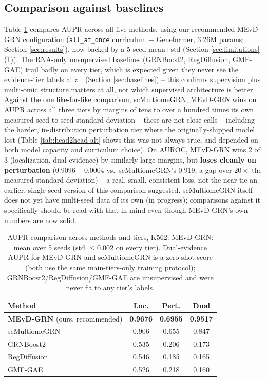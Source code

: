 \documentclass{article}
\theoremstyle{plain}
\theoremstyle{definition}
\begin{document}
\subsection{Comparison against baselines}
\label{sec:head2head}
Table \ref{tab:baselines} compares AUPR across all five methods, using our
recommended MEvD-GRN configuration (\texttt{all\_at\_once} curriculum +
Geneformer, 3.26M params; Section \ref{sec:results}), now backed by a
5-seed mean$\pm$std (Section \ref{sec:limitations} (1)). The RNA-only
unsupervised baselines (GRNBoost2, RegDiffusion, GMF-GAE) trail badly on
every tier, which is expected given they never see the evidence-tier labels
at all (Section \ref{sec:baselines}) -- this confirms supervision plus
multi-omic structure matters at all, not which supervised architecture is
better. Against the one like-for-like comparison, scMultiomeGRN, MEvD-GRN
wins on AUPR across all three tiers by margins of tens to over a hundred
times its own measured seed-to-seed standard deviation -- these are not
close calls -- including the harder, in-distribution perturbation tier
where the originally-shipped model lost (Table \ref{tab:head2head-alt}
shows this was not always true, and depended on both model capacity and
curriculum choice). On AUROC, MEvD-GRN wins 2 of 3 (localization,
dual-evidence) by similarly large margins, but \textbf{loses cleanly on
perturbation} ($0.9096\pm0.0004$ vs.\ scMultiomeGRN's $0.919$, a gap over
$20\times$ the measured standard deviation) -- a real, small, consistent
loss, not the near-tie an earlier, single-seed version of this comparison
suggested. scMultiomeGRN itself does not yet have multi-seed data of its
own (in progress); comparisons against it specifically should be read with
that in mind even though MEvD-GRN's own numbers are now solid.

\begin{table}[t]
\caption{AUPR comparison across methods and tiers, K562. MEvD-GRN: mean over 5 seeds (std $\leq0.002$ on every
tier). Dual-evidence AUPR for MEvD-GRN and scMultiomeGRN is a zero-shot score (both use the same main-tiers-only
training protocol); GRNBoost2/RegDiffusion/GMF-GAE are unsupervised and were never fit to any tier's labels.}
\label{tab:baselines}
\vskip 0.1in
\begin{center}
\begin{small}
\begin{tabular}{lccc}
\toprule
Method & Loc. & Pert. & Dual \\
\midrule
\textbf{MEvD-GRN} (ours, recommended) & \textbf{0.9676} & \textbf{0.6955} & \textbf{0.9517} \\
scMultiomeGRN & 0.906 & 0.655 & 0.847 \\
GRNBoost2 & 0.535 & 0.206 & 0.173 \\
RegDiffusion & 0.546 & 0.185 & 0.165 \\
GMF-GAE & 0.526 & 0.218 & 0.160 \\
\bottomrule
\end{tabular}
\end{small}
\end{center}
\end{table}
\end{document}
